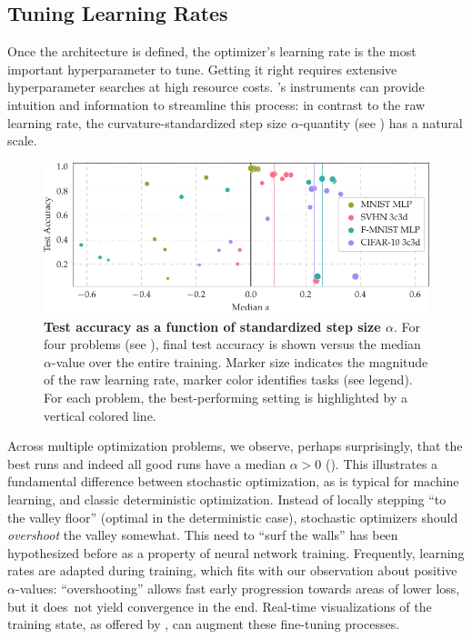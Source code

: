 \subsection{Tuning Learning Rates}
\label{cockpit::sec:alpha_exp}
Once the architecture is defined, the optimizer's learning rate is the most
important hyperparameter to tune. Getting it right requires extensive
hyperparameter searches at high resource costs. \cockpit's instruments can
provide intuition and information to streamline this process: in contrast to the
raw learning rate, the curvature-standardized step size $\alpha$-quantity (see
) has a natural scale.

\begin{figure}
	\begin{center}
		\includegraphics[width=\linewidth]{../repos/cockpit-paper/fig/07_learning_rate_selection/output/median_alpha_vs_performance_thesis-wide}
	\end{center}
  \vspace{-2ex}
	\caption{\textbf{Test accuracy as a function of standardized step size
      $\alpha$}. For four \deepobs problems (see ), final
    test accuracy is shown versus the median $\alpha$-value over the entire
    training. Marker size indicates the magnitude of the raw learning rate,
    marker color identifies tasks (see legend). For each problem, the
    best-performing setting is highlighted by a vertical colored line.}
	\label{cockpit::fig:alpha_exp}
\end{figure}

Across multiple optimization problems, we observe, perhaps surprisingly, that
the best runs and indeed all good runs have a median $\alpha>0$
(). This illustrates a fundamental difference between
stochastic optimization, as is typical for machine learning, and classic
deterministic optimization. Instead of locally stepping ``to the valley floor''
(optimal in the deterministic case), stochastic optimizers should
\emph{overshoot} the valley somewhat. This need to ``surf the walls'' has been
hypothesized before \citep[e.g.][]{wu2018understanding,xing2018walk} as a property of neural
network training. Frequently, learning rates are adapted during training, which
fits with our observation about positive $\alpha$-values: ``overshooting''
allows fast early progression towards areas of lower loss, but it does not yield
convergence in the end. Real-time visualizations of the training state, as
offered by \cockpit, can augment these fine-tuning processes.


